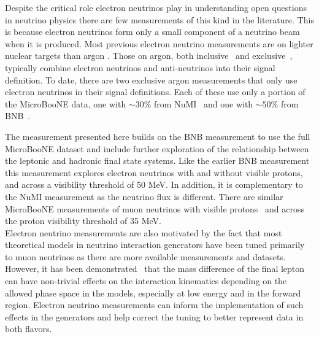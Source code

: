 \documentclass[amsmath,amssymb,aps,prd,showpacs,twocolumn,superscriptaddress,letterpaper,longbibliography, floatfix]{revtex4-2}
\begin{document}
Despite the critical role electron neutrinos play in understanding open questions in neutrino physics there are few measurements of this kind in the literature. This is because electron neutrinos form only a small component of a neutrino beam when it is produced. Most previous electron neutrino measurements are on lighter nuclear targets than argon \cite{T2Knuexsec1,T2Knuexsec2,T2Knuexsec3,NOvanueXsec,COHERENTnuexsec,recentxsecT2K,MinervaExcnuexsec}. Those on argon, both inclusive~\cite{argoneutnuexsec,UBnueInc21,UBnueInc22} and exclusive~\cite{UBnueExcpip}, typically combine electron neutrinos and anti-neutrinos into their signal definition. 
To date, there are two exclusive argon measurements that only use electron neutrinos in their signal definitions. Each of these use only a portion of the MicroBooNE data, one with $\sim30\%$ from NuMI~\cite{nueCCNuMI} and one with $\sim50\%$ from BNB~\cite{MicroBooNEXsec}. 

The measurement presented here 
builds on the BNB measurement to use the full MicroBooNE dataset and include further exploration of the relationship between the leptonic and hadronic final state systems. Like the earlier BNB measurement~\cite{MicroBooNEXsec} this measurement explores electron neutrinos with and without visible protons, and across a visibility threshold of 50 MeV. 
In addition, it is complementary to the NuMI measurement as the neutrino flux is different.
There are similar MicroBooNE measurements of muon neutrinos with visible protons~\cite{MicroBooNE:2025tcm, Stevenpaper} and across the proton visibility threshold \cite{BensAna,BensAnaPRL} of 35 MeV. \\ 

Electron neutrino measurements are also motivated by the fact that most theoretical models in neutrino interaction generators have been tuned primarily to muon neutrinos as there are more available measurements and datasets. However, it has been demonstrated~\cite{Day:2012gb,elecvsMuon2,EvsMuMartini,Ankowski:2017yvm} that the mass difference of the final lepton can have non-trivial effects on the interaction kinematics depending on the allowed phase space in the models, especially at low energy and in the forward region. Electron neutrino measurements can inform the implementation of such effects in the generators and help correct the tuning to better represent data in both flavors. 
\end{document}
